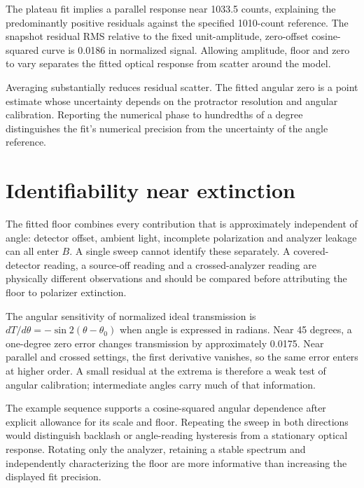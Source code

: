The plateau fit implies a parallel response near 1033.5 counts, explaining the predominantly positive residuals against the specified 1010-count reference. The snapshot residual RMS relative to the fixed unit-amplitude, zero-offset cosine-squared curve is 0.0186 in normalized signal. Allowing amplitude, floor and zero to vary separates the fitted optical response from scatter around the model.

Averaging substantially reduces residual scatter. The fitted angular zero is a point estimate whose uncertainty depends on the protractor resolution and angular calibration. Reporting the numerical phase to hundredths of a degree distinguishes the fit's numerical precision from the uncertainty of the angle reference.

\section{Identifiability near extinction}
The fitted floor combines every contribution that is approximately independent of angle: detector offset, ambient light, incomplete polarization and analyzer leakage can all enter $B$. A single sweep cannot identify these separately. A covered-detector reading, a source-off reading and a crossed-analyzer reading are physically different observations and should be compared before attributing the floor to polarizer extinction.

The angular sensitivity of normalized ideal transmission is $dT/d\theta=-\sin2(\theta-\theta_0)$ when angle is expressed in radians. Near 45 degrees, a one-degree zero error changes transmission by approximately 0.0175. Near parallel and crossed settings, the first derivative vanishes, so the same error enters at higher order. A small residual at the extrema is therefore a weak test of angular calibration; intermediate angles carry much of that information.

The example sequence supports a cosine-squared angular dependence after explicit allowance for its scale and floor. Repeating the sweep in both directions would distinguish backlash or angle-reading hysteresis from a stationary optical response. Rotating only the analyzer, retaining a stable spectrum and independently characterizing the floor are more informative than increasing the displayed fit precision.
